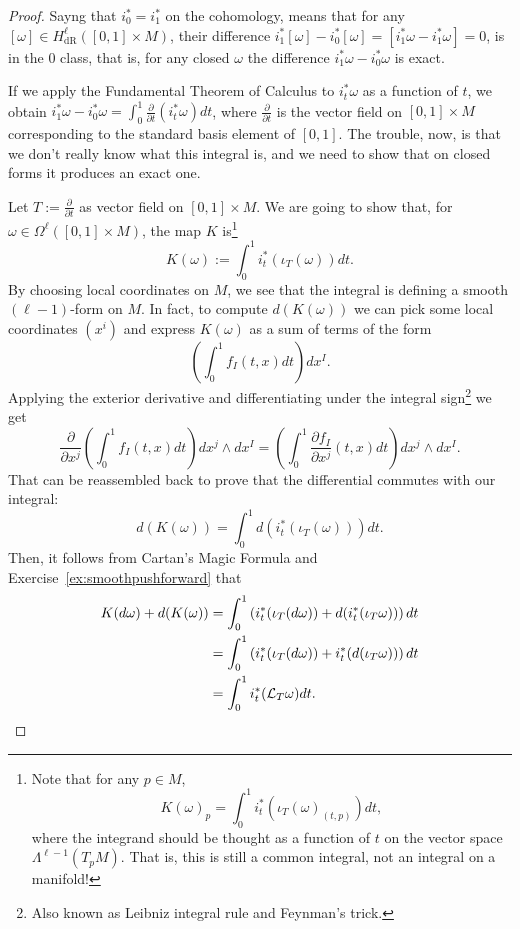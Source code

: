\begin{proof}
  Sayng that  $i_0^* = i_1^*$ on the cohomology, means that for any $[\omega]\in H_{\mathrm{dR}}^\ell([0,1]\times M)$, their difference $i_1^*[\omega] - i_0^*[\omega] = [i_1^*\omega - i_1^*\omega] = 0$, is in the $0$ class, that is, for any closed $\omega$ the difference $i_1^*\omega - i_0^*\omega$ is exact.

  If we apply the Fundamental Theorem of Calculus to $i^*_t\omega$ as a function of $t$, we obtain $i_1^*\omega - i_0^*\omega = \int_0^1 \frac{\partial}{\partial t} (i^*_t \omega) dt$,
  where $\frac{\partial}{\partial t}$ is the vector field on $[0,1]\times M$ corresponding to the standard basis element of $[0,1]$.
  The trouble, now, is that we don't really know what this integral is, and we need to show that on closed forms it produces an exact one.

  Let $T:=\frac{\partial}{\partial t}$ as vector field on $[0,1]\times M$.
  We are going to show that, for $\omega\in\Omega^\ell([0,1]\times M)$, the map $K$ is\footnote{Note that for any $p\in M$,
    \begin{equation}
      K(\omega)_p = \int_0^1 i_t^*(\iota_T(\omega)_{(t,p)})dt,
    \end{equation}
    where the integrand should be thought as a function of $t$ on the vector space $\Lambda^{\ell-1}(T_pM)$.
  That is, this is still a common integral, not an integral on a manifold!}
  \begin{equation}
    K(\omega) := \int_0^1 i^*_t(\iota_T(\omega)) dt.
  \end{equation}
  By choosing local coordinates on $M$, we see that the integral is defining a smooth $(\ell-1)$-form on $M$.
  In fact, to compute $d(K(\omega))$ we can pick some local coordinates $(x^i)$ and express $K(\omega)$ as a sum of terms of the form
  \begin{equation}
    \left(\int_0^1 f_I(t,x) dt\right)dx^I.
  \end{equation}
  Applying the exterior derivative and differentiating under the integral sign\footnote{Also known as Leibniz integral rule and Feynman's trick.} we get
  \begin{equation}
    \frac{\partial}{\partial x^j}\left(\int_0^1 f_I(t,x) dt\right)dx^j\wedge dx^I = \left(\int_0^1 \frac{\partial f_I}{\partial x^j}(t,x) dt\right)dx^j\wedge dx^I.
  \end{equation}
  That can be reassembled back to prove that the differential commutes with our integral:
  \begin{equation}
    d(K(\omega)) = \int_0^1 d(i_t^*(\iota_T(\omega)))dt.
  \end{equation}
  Then, it follows from Cartan's Magic Formula and Exercise~\ref{ex:smoothpushforward} that
  \begin{align}
    K(d\omega) + d(K(\omega))
  &= \int_0^1\left( i_t^*(\iota_T(d\omega)) + d (i_t^*(\iota_T\omega)) \right) dt \\
  &= \int_0^1\left( i_t^*(\iota_T(d\omega)) + i_t^* (d(\iota_T\omega)) \right) dt \\ 
  &= \int_0^1 i_t^*(\mathcal{L}_T\omega) dt.
  \end{align}


\end{proof}
